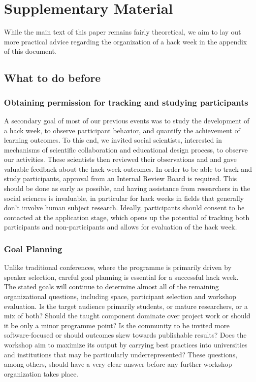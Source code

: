 
\section{Supplementary Material}

While the main text of this paper remains fairly theoretical, we aim to lay out more practical advice regarding the organization of a hack week in the appendix of this document.

\subsection{What to do before}

\subsubsection{Obtaining permission for tracking and studying participants}
A secondary goal of most of our previous events was to study the development of a hack week, to observe participant behavior, and quantify the achievement of learning outcomes. To this end, we invited social scientists, interested in mechanisms of scientific collaboration and educational design process, to observe our activities. These scientists then reviewed their observations and and gave valuable feedback about the hack week outcomes. In order to be able to track and study participants, approval from an Internal Review Board is required. This should be done as early as possible, and having assistance from researchers in the social sciences is invaluable, in particular for hack weeks in fields that generally don't involve human subject research. Ideally, participants should consent to be contacted at the application stage, which opens up the potential of tracking both participants and non-participants and allows for evaluation of the hack week.

\subsubsection{Goal Planning}

Unlike traditional conferences, where the programme is primarily driven by speaker selection, careful goal planning is essential for a successful hack week. The stated goals will continue to determine almost all of the remaining organizational questions, including space, participant selection and workshop evaluation. Is the target audience primarily students, or mature researchers, or a mix of both? Should the taught component dominate over project work or should it be only a minor programme point? Is the community to be invited more software-focused or should outcomes skew towards publishable results? Does the workshop aim to maximize its output by carrying best practices into universities and institutions that may be particularly underrepresented? These questions, among others, should have a very clear answer before any further workshop organization takes place.


